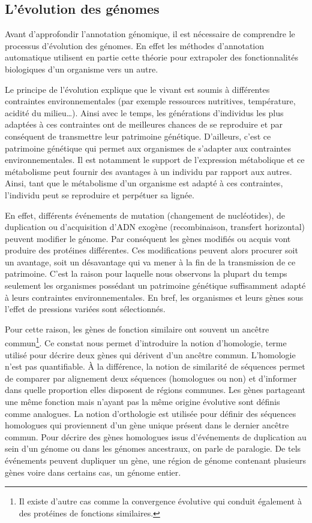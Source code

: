 \begin{refsegment}
    \subsection{L’évolution des génomes}
    Avant d'approfondir l’annotation génomique, il est nécessaire de comprendre le processus d’évolution des génomes. En effet les méthodes d’annotation automatique utilisent en partie cette théorie pour extrapoler des fonctionnalités biologiques d’un organisme vers un autre.
    
    Le principe de l'évolution explique que le vivant est soumis à différentes contraintes environnementales (par exemple ressources nutritives, température, acidité du milieu\ldots ). Ainsi avec le temps, les générations d’individus les plus adaptées à ces contraintes ont de meilleures chances de se reproduire et par conséquent de transmettre leur patrimoine génétique. D’ailleurs, c’est ce patrimoine génétique qui permet aux organismes de s’adapter aux contraintes environnementales. Il est notamment le support de l’expression métabolique et ce métabolisme peut fournir des avantages à un individu par rapport aux autres. Ainsi, tant que le métabolisme d’un organisme est adapté à ces contraintes, l’individu peut se reproduire et perpétuer sa lignée.
    
    En effet, différents événements de mutation (changement de nucléotides), de duplication ou d’acquisition d’ADN exogène (recombinaison, transfert horizontal) peuvent modifier le génome. Par conséquent les gènes modifiés ou acquis vont produire des protéines différentes. Ces modifications peuvent alors procurer soit un avantage, soit un désavantage qui va mener à la fin de la transmission de ce patrimoine. C'est la raison pour laquelle nous observons la plupart du temps seulement les organismes possédant un patrimoine génétique suffisamment adapté à leurs contraintes environnementales. En bref, les organismes et leurs gènes sous l’effet de pressions variées sont sélectionnés.
    
    Pour cette raison, les gènes de fonction similaire ont souvent un ancêtre commun\footnote{Il existe d'autre cas comme la convergence évolutive qui conduit également à des protéines de fonctions similaires. }. Ce constat nous permet d'introduire la notion d'homologie, terme utilisé pour décrire deux gènes qui dérivent d'un ancêtre commun. L'homologie n'est pas quantifiable. À la différence, la notion de similarité de séquences permet de comparer par alignement deux séquences (homologues ou non) et d'informer dans quelle proportion elles disposent de régions communes. Les gènes partageant une même fonction mais n’ayant pas la même origine évolutive sont définis comme analogues. La notion d'orthologie est utilisée pour définir des séquences homologues qui proviennent d’un gène unique présent dans le dernier ancêtre commun. Pour décrire des gènes homologues issus d'événements de duplication au sein d'un génome ou dans les génomes ancestraux, on parle de paralogie. De tels événements peuvent dupliquer un gène, une région de génome contenant plusieurs gènes voire dans certains cas, un génome entier.
    

\end{refsegment}
